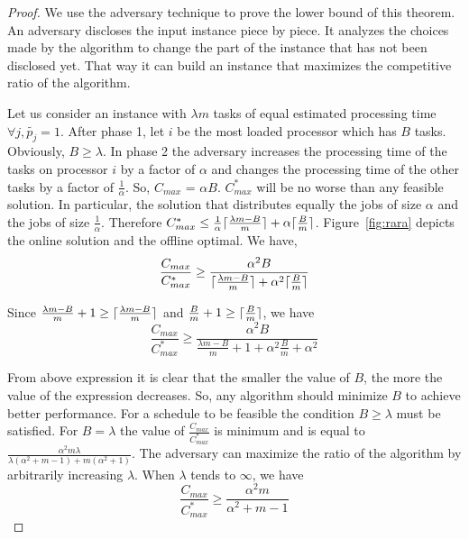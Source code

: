 \documentclass[10pt, conference, compsocconf]{IEEEtran}
\DeclarePairedDelimiter{\ceil}{\lceil}{\rceil}
\begin{document}
\begin{proof}
  We use the adversary technique to prove the lower bound of this
  theorem. An adversary discloses the input instance piece by
  piece. It analyzes the choices made by the algorithm to change the
  part of the instance that has not been disclosed yet. That way it
  can build an instance that maximizes the competitive ratio of the
  algorithm.
 
  Let us consider an instance with $\lambda m$ tasks of equal
  estimated processing time $\forall j, \tilde{p_j} = 1$. After phase
  1, let $i$ be the most loaded processor which has $B$
  tasks. Obviously, $B \geq \lambda$. In phase 2 the adversary
  increases the processing time of the tasks on processor $i$ by a
  factor of $\alpha$ and changes the processing time of the other
  tasks by a factor of $\frac{1}{\alpha}$. So, $ C_{max}$ = $\alpha
  B$. ${C^{*}_{max}}$ will be no worse than any feasible solution. In
  particular, the solution that distributes equally the jobs of size
  $\alpha$ and the jobs of size $\frac{1}{\alpha}$. Therefore
  ${C^{*}_{max}} \leq \frac{1}{\alpha }\ceil {\frac{\lambda m - B
    }{m}}+ \alpha\ceil{\frac{B}{m}} $.  Figure~\ref{fig:rara} depicts
  the online solution and the offline optimal. We have,
 \begin{equation}\nonumber
   \frac{C_{max}}{C^{*}_{max}}
   \geq \frac{\alpha^{2} B  }{\ceil{\frac{
        \lambda m - B }{m}}+\alpha^2\ceil{\frac{B}{m}}}
 \end{equation}
   
 Since $\frac{ \lambda m - B }{m} +1 \geq\ceil{\frac{ \lambda m - B
   }{m}}$ and $\frac{B}{m}+1\geq\ceil{\frac{B}{m}}$, we have
 \begin{equation}\nonumber
   \frac{C_{max}}{C^{*}_{max}}
   \geq \frac{\alpha^{2} B  }{\frac{
       \lambda m - B }{m}+1+\alpha^2\frac{B}{m}+\alpha^{2}}
 \end{equation}
 
 From above expression it is clear that the smaller the value of $B$, the more the
 value of the expression decreases. So, any algorithm should minimize
 $B$ to achieve better performance.  For a schedule to be feasible the
 condition $B \geq \lambda$ must be satisfied. For $B = \lambda$ the
 value of $\frac{C_{max}}{C^{*}_{max}}$ is minimum and is equal to
 $\frac{\alpha^{2} m \lambda }{\lambda(\alpha^{2}+m-1)+
   m(\alpha^{2}+1)}$. The adversary can maximize the ratio of the
 algorithm by arbitrarily increasing $\lambda$. When $\lambda$ tends
 to $\infty$, we have
 \begin{equation}\nonumber
       \frac{C_{max}}{C^{*}_{max}}
       \geq \frac{\alpha^{2}m  }{\alpha^{2}+m-1}
     \end{equation}
 


\end{proof}
\end{document}
